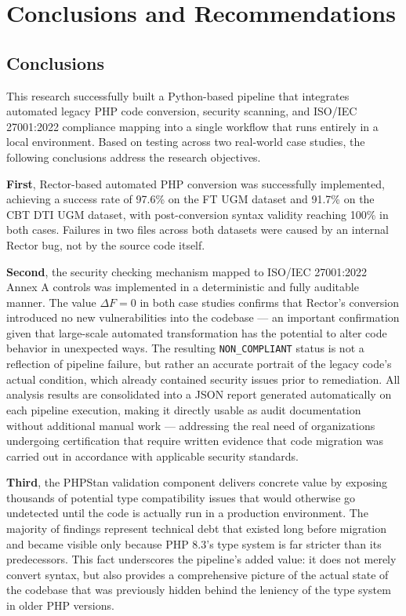 
\chapter{Conclusions and Recommendations}

\section{Conclusions}

This research successfully built a Python-based pipeline that 
integrates automated legacy PHP code conversion, security 
scanning, and ISO/IEC 27001:2022 compliance mapping into a 
single workflow that runs entirely in a local environment. Based 
on testing across two real-world case studies, the following 
conclusions address the research objectives.

\textbf{First}, Rector-based automated PHP conversion was 
successfully implemented, achieving a success rate of 97.6\% on 
the FT UGM dataset and 91.7\% on the CBT DTI UGM dataset, with 
post-conversion syntax validity reaching 100\% in both cases. 
Failures in two files across both datasets were caused by an 
internal Rector bug, not by the source code itself.

\textbf{Second}, the security checking mechanism mapped to 
ISO/IEC 27001:2022 Annex A controls was implemented in a 
deterministic and fully auditable manner. The value $\Delta F = 0$ 
in both case studies confirms that Rector's conversion introduced 
no new vulnerabilities into the codebase --- an important 
confirmation given that large-scale automated transformation has 
the potential to alter code behavior in unexpected ways. The 
resulting \texttt{NON\_COMPLIANT} status is not a reflection of 
pipeline failure, but rather an accurate portrait of the legacy 
code's actual condition, which already contained security issues 
prior to remediation. All analysis results are consolidated into 
a JSON report generated automatically on each pipeline execution, 
making it directly usable as audit documentation without 
additional manual work --- addressing the real need of 
organizations undergoing certification that require written 
evidence that code migration was carried out in accordance with 
applicable security standards.

\textbf{Third}, the PHPStan validation component delivers 
concrete value by exposing thousands of potential type 
compatibility issues that would otherwise go undetected until 
the code is actually run in a production environment. The 
majority of findings represent technical debt that existed long 
before migration and became visible only because PHP 8.3's type 
system is far stricter than its predecessors. This fact 
underscores the pipeline's added value: it does not merely 
convert syntax, but also provides a comprehensive picture of the 
actual state of the codebase that was previously hidden behind 
the leniency of the type system in older PHP versions.

